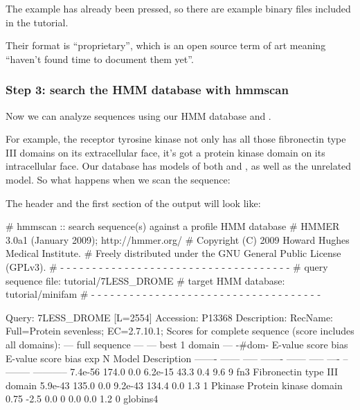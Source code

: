 The  example has already been pressed, so there
are example binary files 
included in the tutorial.

Their format is ``proprietary'', which is an open source term of art
meaning ``haven't found time to document them yet''.



\subsubsection{Step 3: search the HMM database with hmmscan}

Now we can analyze sequences using our HMM database and
. 

For example, the receptor tyrosine kinase  not only
has all those fibronectin type III domains on its extracellular face,
it's got a protein kinase domain on its intracellular face. Our
 database has models of both  and
, as well as the unrelated  model. So
what happens when we scan the  sequence:


The header and the first section of the output will look like:

\begin{sreoutput}
# hmmscan :: search sequence(s) against a profile HMM database
# HMMER 3.0a1 (January 2009); http://hmmer.org/
# Copyright (C) 2009 Howard Hughes Medical Institute.
# Freely distributed under the GNU General Public License (GPLv3).
# - - - - - - - - - - - - - - - - - - - - - - - - - - - - - - - - - - - -
# query sequence file:             tutorial/7LESS_DROME
# target HMM database:             tutorial/minifam
# - - - - - - - - - - - - - - - - - - - - - - - - - - - - - - - - - - - -

Query:       7LESS_DROME  [L=2554]
Accession:   P13368
Description: RecName: Full=Protein sevenless;          EC=2.7.10.1;
Scores for complete sequence (score includes all domains):
 --- full sequence ---   --- best 1 domain ---    -#dom-
  E-value  score  bias    E-value  score  bias    exp  N  Model    Description
  ------- ------ -----    ------- ------ -----   ---- --  -------- -----------
  7.4e-56  174.0   0.0    6.2e-15   43.3   0.4    9.6  9  fn3      Fibronectin type III domain
  5.9e-43  135.0   0.0    9.2e-43  134.4   0.0    1.3  1  Pkinase  Protein kinase domain
     0.75   -2.5   0.0          0    0.0   0.0    1.2  0  globins4
\end{sreoutput}

